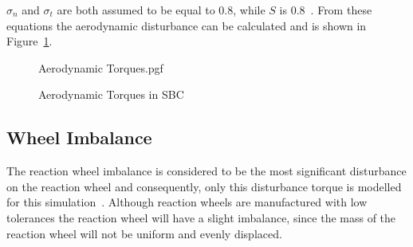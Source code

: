 $\sigma_n$ and $\sigma_t$ are both assumed to be equal to 0.8, while $S$ is $\num{0.8}$~\cite{steyn2011CubeSat}. From these equations the aerodynamic disturbance can be calculated and is shown in Figure~\ref{fig:AerodynamicTorques}.
\begin{figure}[!htb]
	\centering
	\def\pgfwidth{10cm}
	{Aerodynamic Torques.pgf}
	
	\caption{Aerodynamic Torques in SBC}
	\label{fig:AerodynamicTorques}
\end{figure}

\subsection{Wheel Imbalance}
The reaction wheel imbalance is considered to be the most significant disturbance on the reaction wheel and consequently, only this disturbance torque is modelled for this simulation~\cite{bialke1998high}. Although reaction wheels are manufactured with low tolerances the reaction wheel will have a slight imbalance, since the mass of the reaction wheel will not be uniform and evenly displaced. 

